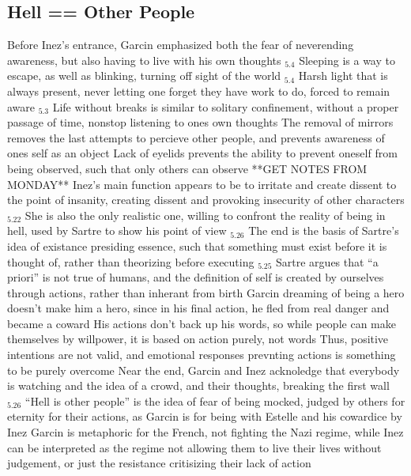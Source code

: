 \documentclass[11 pt, twoside]{article}
\newenvironment{outline*}
{
	\begin{outline}[enumerate]
	}
	{\end{outline}
}
\newcommand{\footb}[2]{\hyperlink{#1}{$_{#1.#2}$}}
\begin{document}
\subsection{Hell == Other People}
\begin{outline*}
\1 Before Inez's entrance, Garcin emphasized both the fear of neverending awareness, but also having to live with his own thoughts \footb{5}{4}
\2 Sleeping is a way to escape, as well as blinking, turning off sight of the world \footb{5}{4}
\2 Harsh light that is always present, never letting one forget they have work to do, forced to remain aware \footb{5}{3}
\1 Life without breaks is similar to solitary confinement, without a proper passage of time, nonstop listening to ones own thoughts
\2 The removal of mirrors removes the last attempts to percieve other people, and prevents awareness of ones self as an object
\2 Lack of eyelids prevents the ability to prevent oneself from being observed, such that only others can observe
\1 **GET NOTES FROM MONDAY** 
\1 Inez's main function appears to be to irritate and create dissent to the point of insanity, creating dissent and provoking insecurity of other characters \footb{5}{22}
\2 She is also the only realistic one, willing to confront the reality of being in hell, used by Sartre to show his point of view  \footb{5}{26}
\1 The end is the basis of Sartre's idea of existance presiding essence, such that something must exist before it is thought of, rather than theorizing before executing \footb{5}{25}
\2 Sartre argues that ``a priori'' is not true of humans, and the definition of self is created by ourselves through actions, rather than inherant from birth
\2 Garcin dreaming of being a hero doesn't make him a hero, since in his final action, he fled from real danger and became a coward
\2 His actions don't back up his words, so while people can make themselves by willpower, it is based on action purely, not words
\2 Thus, positive intentions are not valid, and emotional responses prevnting actions is something to be purely overcome
\1 Near the end, Garcin and Inez acknoledge that everybody is watching and the idea of a crowd, and their thoughts, breaking the first wall \footb{5}{26}
\2 ``Hell is other people'' is the idea of fear of being mocked, judged by others for eternity for their actions, as Garcin is for being with Estelle and his cowardice by Inez
\2 Garcin is metaphoric for the French, not fighting the Nazi regime, while Inez can be interpreted as the regime not allowing them to live their lives without judgement, or just the resistance critisizing their lack of action
\end{outline*}
\end{document}

